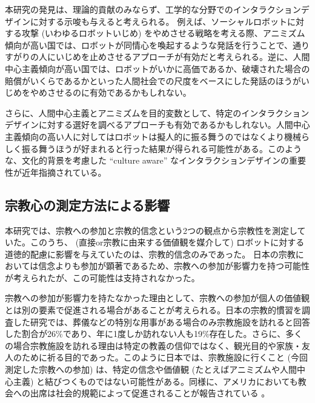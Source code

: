 \documentclass[a4j,12pt]{jreport}
\begin{document}
本研究の発見は、理論的貢献のみならず、工学的な分野でのインタラクションデザインに対する示唆も与えると考えられる。
例えば、ソーシャルロボットに対する攻撃 (いわゆるロボットいじめ\cite{ijime}) をやめさせる戦略を考える際、アニミズム傾向が高い国では、ロボットが同情心を喚起するような発話を行うことで、通りすがりの人にいじめを止めさせるアプローチが有効だと考えられる。逆に、人間中心主義傾向が高い国では、ロボットがいかに高価であるか、破壊された場合の賠償がいくらであるかといった人間社会での尺度をベースにした発話のほうがいじめをやめさせるのに有効であるかもしれない。

さらに、人間中心主義とアニミズムを目的変数として、特定のインタラクションデザインに対する選好を調べるアプローチも有効であるかもしれない。人間中心主義傾向の高い人に対してはロボットは擬人的に振る舞うのではなくより機械らしく振る舞うほうが好まれると行った結果が得られる可能性がある。このような、文化的背景を考慮した ``culture aware''\cite{cultu} なインタラクションデザインの重要性が近年指摘されている。


\subsection{宗教心の測定方法による影響}
本研究では、宗教への参加と宗教的信念という2つの観点から宗教性を測定していた。このうち、 (直接or宗教に由来する価値観を媒介して) ロボットに対する道徳的配慮に影響を与えていたのは、宗教的信念のみであった。
日本の宗教においては信念よりも参加が顕著であるため\cite{kava}、宗教への参加が影響力を持つ可能性が考えられたが、この可能性は支持されなかった。


宗教への参加が影響力を持たなかった理由として、宗教への参加が個人の価値観とは別の要素で促進される場合があることが考えられる。日本の宗教的慣習を調査した研究\cite{kava}では、葬儀などの特別な用事がある場合のみ宗教施設を訪れると回答した割合が26\%であり、年に1度しか訪れない人も19\%存在した。さらに、多くの場合宗教施設を訪れる理由は特定の教義の信仰ではなく、観光目的や家族・友人のために祈る目的であった。このように日本では、宗教施設に行くこと (今回測定した宗教への参加) は、特定の信念や価値観 (たとえばアニミズムや人間中心主義) と結びつくものではない可能性がある。同様に、アメリカにおいても教会への出席は社会的規範によって促進されることが報告されている\cite{church} 。
\end{document}
